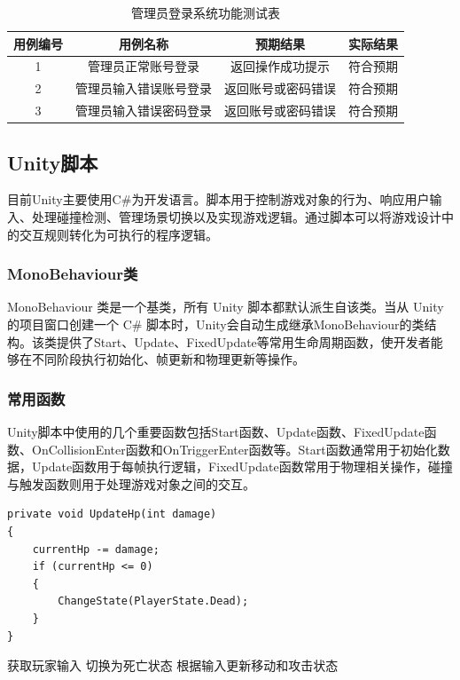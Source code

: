 \documentclass[12pt]{graduate-design-manual}
\begin{document}
\begin{table}[H]
\centering
\caption{管理员登录系统功能测试表}
\begin{tabular}{cccc}
\toprule
用例编号 & 用例名称 & 预期结果 & 实际结果 \\
\midrule
1 & 管理员正常账号登录 & 返回操作成功提示 & 符合预期 \\
2 & 管理员输入错误账号登录 & 返回账号或密码错误 & 符合预期 \\
3 & 管理员输入错误密码登录 & 返回账号或密码错误 & 符合预期 \\
\bottomrule
\end{tabular}
\end{table}

\subsection{Unity脚本}
目前Unity主要使用C\#为开发语言。脚本用于控制游戏对象的行为、响应用户输入、处理碰撞检测、管理场景切换以及实现游戏逻辑。通过脚本可以将游戏设计中的交互规则转化为可执行的程序逻辑。

\subsubsection{MonoBehaviour类}
MonoBehaviour 类是一个基类，所有 Unity 脚本都默认派生自该类。当从 Unity 的项目窗口创建一个 C\# 脚本时，Unity会自动生成继承MonoBehaviour的类结构。该类提供了Start、Update、FixedUpdate等常用生命周期函数，使开发者能够在不同阶段执行初始化、帧更新和物理更新等操作。

\subsubsection{常用函数}
Unity脚本中使用的几个重要函数包括Start函数、Update函数、FixedUpdate函数、OnCollisionEnter函数和OnTriggerEnter函数等。Start函数通常用于初始化数据，Update函数用于每帧执行逻辑，FixedUpdate函数常用于物理相关操作，碰撞与触发函数则用于处理游戏对象之间的交互。

\begin{lstlisting}
private void UpdateHp(int damage)
{
    currentHp -= damage;
    if (currentHp <= 0)
    {
        ChangeState(PlayerState.Dead);
    }
}
\end{lstlisting}

\begin{algorithm}[H]
\caption{角色状态更新流程}
\label{alg:state-update}
\begin{algorithmic}[1]
\State 获取玩家输入
    \State 切换为死亡状态
\Else
    \State 根据输入更新移动和攻击状态
\EndIf
\end{algorithmic}
\end{algorithm}
\end{document}
